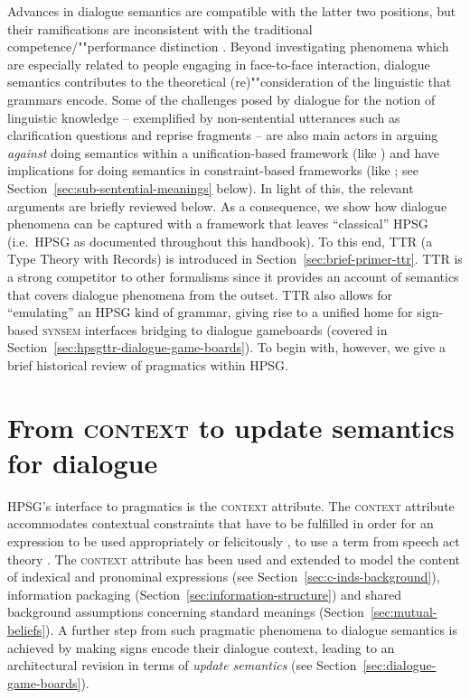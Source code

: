 \documentclass[output=paper,biblatex,babelshorthands,newtxmath,draftmode,colorlinks,citecolor=brown]{langscibook}
\begin{document}
\largerpage[2]
Advances in dialogue semantics are compatible with the latter two positions, but their ramifications
are inconsistent with the traditional competence/""performance distinction
\citep{Ginzburg:Poesio:2016,Kempson:Cann:Gregoromichelaki:Chatzikyriakidis:2016}.
%
Beyond investigating phenomena which are especially related to people engaging in face-to-face interaction, dialogue semantics contributes to the theoretical (re)""consideration of the linguistic  that grammars encode.
%
Some of the challenges posed by dialogue for the notion of linguistic knowledge -- exemplified by non-sentential utterances such as clarification questions and reprise fragments \citep{Fernandez:Ginzburg:2002,Fernandez:Ginzburg:Lappin:2007} -- are also main actors in arguing \emph{against} doing semantics within a unification-based framework (like \citealt{Pollard:Sag:1987}) and have implications for doing semantics in constraint-based frameworks (like \citealt{Pollard:Sag:1994}; see Section~\ref{sec:sub-sentential-meanings} below).%
In light of this, the relevant arguments are briefly reviewed below.
As a consequence, we show how dialogue phenomena can be captured with a framework that leaves \enquote{classical} HPSG (i.e.\ HPSG as documented throughout this handbook).
To this end, TTR (a Type Theory with Records) is introduced in Section~\ref{sec:brief-primer-ttr}. 
TTR is a strong competitor to other formalisms since it provides an account of semantics that covers dialogue phenomena from the outset.
TTR also allows for \enquote{emulating} an HPSG kind of grammar, giving rise to a unified home for sign-based \textsc{synsem} interfaces bridging to dialogue gameboards (covered in Section~\ref{sec:hpsgttr-dialogue-game-boards}).
To begin with, however, we give a brief historical review of pragmatics within HPSG.


\section{From \textsc{context} to update semantics for dialogue}
\label{sec:history}

HPSG's interface to pragmatics is the \textsc{context} attribute. The
\textsc{context} attribute accommodates contextual constraints that have to be
fulfilled in order for an expression to be used appropriately or felicitously \citep{Austin:1962},
to use a term from speech act theory \citep[]{Pollard:Sag:1994}.  The \textsc{context}
attribute has been used and extended to model the content of indexical and pronominal expressions
(see Section~\ref{sec:c-inds-background}), information packaging
(Section~\ref{sec:information-structure}) and shared background assumptions concerning standard
meanings (Section~\ref{sec:mutual-beliefs}). A further step from such pragmatic phenomena to
dialogue semantics is achieved by making signs encode their dialogue context, leading to an
architectural revision in terms of \emph{update semantics} (see
Section~\ref{sec:dialogue-game-boards}).
\end{document}
